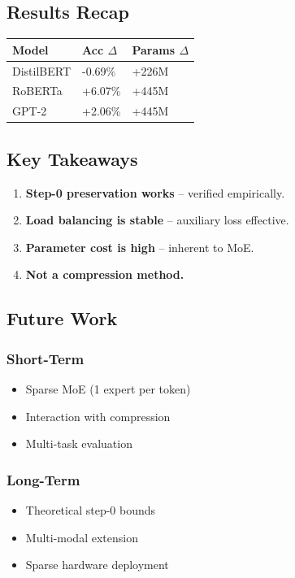 \subsection{Results Recap}

\begin{table}[H]
\centering
\small
\begin{tabular}{lll}
\toprule
\textbf{Model} & \textbf{Acc $\Delta$} & \textbf{Params $\Delta$} \\
\midrule
DistilBERT & -0.69\% & +226M \\
RoBERTa & +6.07\% & +445M \\
GPT-2 & +2.06\% & +445M \\
\bottomrule
\end{tabular}
\end{table}

\subsection{Key Takeaways}

\begin{enumerate}
\item \textbf{Step-0 preservation works} -- verified empirically.
\item \textbf{Load balancing is stable} -- auxiliary loss effective.
\item \textbf{Parameter cost is high} -- inherent to MoE.
\item \textbf{Not a compression method.}

\end{enumerate}
\subsection{Future Work}

\subsubsection{Short-Term}
\begin{itemize}
\item Sparse MoE (1 expert per token)
\item Interaction with compression
\item Multi-task evaluation

\end{itemize}
\subsubsection{Long-Term}
\begin{itemize}
\item Theoretical step-0 bounds
\item Multi-modal extension
\item Sparse hardware deployment

\end{itemize}
